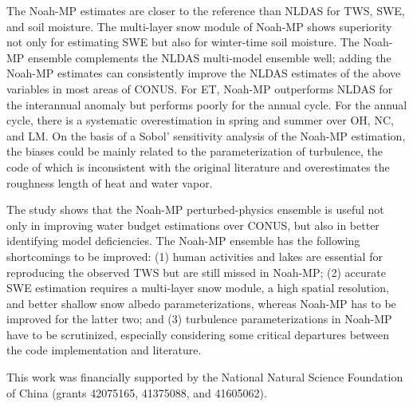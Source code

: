 \documentclass[essd, manuscript]{copernicus}
\begin{document}
The Noah-MP estimates are closer to the reference than NLDAS for TWS, SWE, and soil moisture. The multi-layer snow module of Noah-MP shows superiority not only for estimating SWE but also for winter-time soil moisture. The Noah-MP ensemble complements the NLDAS multi-model ensemble well; adding the Noah-MP estimates can consistently improve the NLDAS estimates of the above variables in most areas of CONUS. For ET, Noah-MP outperforms NLDAS for the interannual anomaly but performs poorly for the annual cycle. For the annual cycle, there is a systematic overestimation in spring and summer over OH, NC, and LM. On the basis of a Sobol' sensitivity analysis of the Noah-MP estimation, the biases could be mainly related to the parameterization of turbulence, the code of which is inconsistent with the original literature and overestimates the roughness length of heat and water vapor.

The study shows that the Noah-MP perturbed-physics ensemble is useful not only in improving water budget estimations over CONUS, but also in better identifying model deficiencies. The Noah-MP ensemble has the following shortcomings to be improved: (1) human activities and lakes are essential for reproducing the observed TWS but are still missed in Noah-MP; (2) accurate SWE estimation requires a multi-layer snow module, a high spatial resolution, and better shallow snow albedo parameterizations, whereas Noah-MP has to be improved for the latter two; and (3) turbulence parameterizations in Noah-MP have to be scrutinized, especially considering some critical departures between the code implementation and literature.

\label{sec:contribution}



\begin{acknowledgements}
This work was financially supported by the National Natural Science Foundation of China (grants 42075165, 41375088, and 41605062).
\end{acknowledgements}



\end{document}
